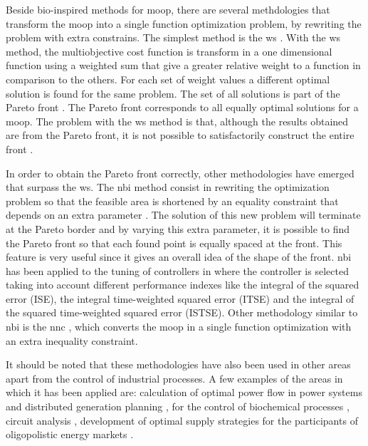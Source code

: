 Beside bio-inspired methods for \gls{moop}, there are several methdologies that transform the \gls{moop} into a single function optimization problem, by rewriting the problem with extra constrains. The simplest method is the \gls{ws} \citep{Marler2004}. With the \gls{ws} method, the multiobjective cost function is transform in a one dimensional function using a weighted sum that give a greater relative weight to a function in comparison to the others. For each set of weight values a different optimal solution is found for the same problem. The set of all solutions is part of the Pareto front \citep{Marler2004}. The Pareto front corresponds to all equally optimal solutions for a \gls{moop}. The problem with the \gls{ws} method is that, although the results obtained are from the Pareto front, it is not possible to satisfactorily construct the entire front \citep{Das1997,Messac2000,Marler2010}.

In order to obtain the Pareto front correctly, other methodologies have emerged that surpass the \gls{ws}. The \gls{nbi} method consist in rewriting the optimization problem so that the feasible area is shortened by an equality constraint that depends on an extra parameter \citep{Das1998}. The solution of this new problem will terminate at the Pareto border and by varying this extra parameter, it is possible to find the Pareto front so that each found point is equally spaced at the front. This feature is very useful since it gives an overall idea of the shape of the front. \gls{nbi} has been applied to the tuning of controllers in \citet{Gambier2009} where the controller is selected taking into account different performance indexes like the integral of the squared error (ISE), the integral time-weighted squared error (ITSE) and the integral of the squared time-weighted squared error (ISTSE). Other methodology similar to \gls{nbi} is the \gls{nnc} \citep{Messac2003}, which converts the \gls{moop} in a single function optimization with an extra inequality constraint.

It should be noted that these methodologies have also been used in other areas apart from the control of industrial processes. A few examples of the areas in which it has been applied are: calculation of optimal power flow in power systems \citep{Roman2006}  and distributed generation planning \citep{Zangeneh2007},  for the control of biochemical processes \citep{Logist2009}, circuit analysis \citep{Stehr2003}, development of optimal supply strategies for the participants of oligopolistic energy markets \citep{Vahidinasab2010}.

